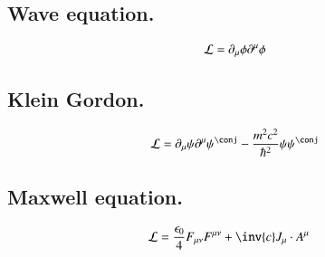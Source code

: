 \documentclass{article}
\begin{document}
\subsection{ Wave equation. }

\begin{align}
\mathcal{L} = \partial_\mu \phi \partial^\mu \phi
\end{align}

\subsection{ Klein Gordon. }

\begin{align}
\LL = \partial_\mu \psi \partial^\mu \psi^\conj - \frac{m^2 c^2}{\hbar^2} \psi \psi^\conj
\end{align}

\subsection{ Maxwell equation. }

\begin{align}
\LL &= \frac{\epsilon_0}{4} F_{\mu\nu}F^{\mu\nu} + \inv{c} J_\mu \cdot A^\mu
\end{align}
 


\end{document}
